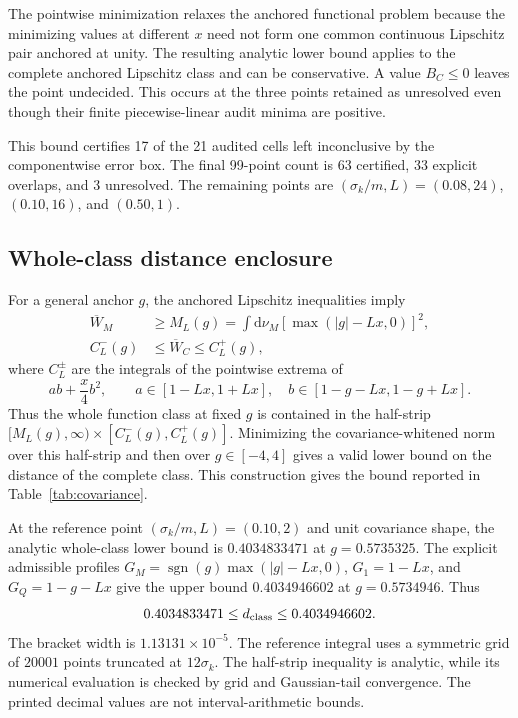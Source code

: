 \documentclass[12pt]{iopjournal}
\newcommand{\dd}{\mathrm d}
\begin{document}
The pointwise minimization relaxes the anchored functional problem because the minimizing values at different $x$ need not form one common continuous Lipschitz pair anchored at unity. The resulting analytic lower bound applies to the complete anchored Lipschitz class and can be conservative. A value $B_C\le0$ leaves the point undecided. This occurs at the three points retained as unresolved even though their finite piecewise-linear audit minima are positive.

This bound certifies 17 of the 21 audited cells left inconclusive by the componentwise error box. The final 99-point count is 63 certified, 33 explicit overlaps, and 3 unresolved. The remaining points are $(\sigma_k/m,L)=(0.08,24)$, $(0.10,16)$, and $(0.50,1)$.

\subsection{Whole-class distance enclosure}

For a general anchor $g$, the anchored Lipschitz inequalities imply
\begin{align}
\overline W_M&\ge M_L(g)
=\int\dd\nu_M[\max(|g|-Lx,0)]^2,\\
C_L^-(g)&\le\overline W_C\le C_L^+(g),
\end{align}
where $C_L^\pm$ are the integrals of the pointwise extrema of
\begin{equation}
ab+\frac{x}{4}b^2,\qquad
a\in[1-Lx,1+Lx],\quad
b\in[1-g-Lx,1-g+Lx].
\end{equation}
Thus the whole function class at fixed $g$ is contained in the half-strip
$[M_L(g),\infty)\times[C_L^-(g),C_L^+(g)]$. Minimizing the covariance-whitened norm over this half-strip and then over $g\in[-4,4]$ gives a valid lower bound on the distance of the complete class. This construction gives the bound reported in Table~\ref{tab:covariance}.

At the reference point $(\sigma_k/m,L)=(0.10,2)$ and unit covariance shape, the analytic whole-class lower bound is $0.4034833471$ at $g=0.5735325$. The explicit admissible profiles $G_M=\operatorname{sgn}(g)\max(|g|-Lx,0)$, $G_1=1-Lx$, and $G_Q=1-g-Lx$ give the upper bound $0.4034946602$ at $g=0.5734946$. Thus
\begin{equation}
0.4034833471\le d_{\rm class}\le0.4034946602.
\end{equation}
The bracket width is $1.13131\times10^{-5}$. The reference integral uses a symmetric grid of $20001$ points truncated at $12\sigma_k$. The half-strip inequality is analytic, while its numerical evaluation is checked by grid and Gaussian-tail convergence. The printed decimal values are not interval-arithmetic bounds.
\end{document}
